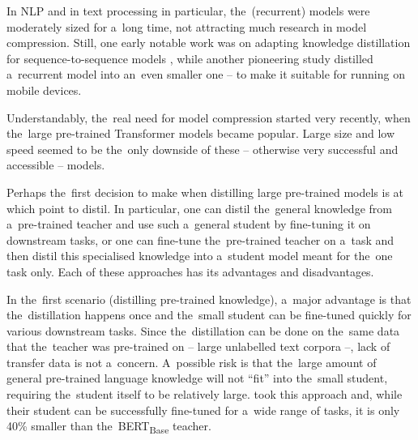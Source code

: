 \documentclass[bsc,frontabs,singlespacing,parskip,deptreport]{infthesis}
\begin{document}
{{{      %
      In NLP and in text processing in particular, the~(recurrent) models were moderately sized for a~long time, not attracting much research in model compression. Still, one early notable work was on adapting knowledge distillation for sequence-to-sequence models \citep{Kim_2016}, while another pioneering study \citep{Yu_2018} distilled a~recurrent model into an~even smaller one -- to make it suitable for running on mobile devices.

      Understandably, the~real need for model compression started very recently, when the~large pre-trained Transformer models became popular. Large size and low speed seemed to be the~only downside of these -- otherwise very successful and accessible -- models.

      Perhaps the~first decision to make when distilling large pre-trained models is at which point to distil. In particular, one can distil the~general knowledge from a~pre-trained teacher and use such a~general student by fine-tuning it on downstream tasks, or one can fine-tune the~pre-trained teacher on a~task and then distil this specialised knowledge into a~student model meant for the~one task only. Each of these approaches has its advantages and disadvantages.

      In the~first scenario (distilling pre-trained knowledge), a~major advantage is that the~distillation happens once and the~small student can be fine-tuned quickly for various downstream tasks.
      Since the~distillation can be done on the~same data that the~teacher was pre-trained on -- large unlabelled text corpora --, lack of transfer data is not a~concern.
      A~possible risk is that the~large amount of general pre-trained language knowledge will not ``fit'' into the~small student, requiring the~student itself to be relatively large. \citet{Sanh_2019} took this approach and, while their student can be successfully fine-tuned for a~wide range of tasks, it is only 40\% smaller than the~BERT\textsubscript{Base} teacher.

}}}
\end{document}
